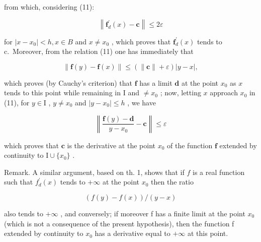 from which, considering (11):

\[
\left\| \mathbf {f} _ {d} ^ {\prime} (x) - \mathbf {c} \right\| \leqslant 2 \varepsilon
\]

for \(|x - x_{0}| < h, x \in B\) and \(x \neq x_{0}\) , which proves that \(\mathbf{f}_{d}^{\prime}(x)\) tends to c.~Moreover, from the relation (11) one has immediately that

\[
\left\| \mathbf {f} (y) - \mathbf {f} (x) \right\| \leqslant \left(\left\| \mathbf {c} \right\| + \varepsilon\right) | y - x |,
\]

which proves (by Cauchy's criterion) that \(\mathbf{f}\) has a limit \(\mathbf{d}\) at the point \(x_0\) as \(x\) tends to this point while remaining in \(\mathrm{I}\) and \(\neq x_0\) ; now, letting \(x\) approach \(x_0\) in (11), for \(y \in \mathrm{I}\) , \(y \neq x_0\) and \(|y - x_0| \leqslant h\) , we have

\[
\left\| \frac {\mathbf {f} (y) - \mathbf {d}}{y - x _ {0}} - \mathbf {c} \right\| \leqslant \varepsilon
\]

which proves that \(\mathbf{c}\) is the derivative at the point \(x_0\) of the function \(\mathbf{f}\) extended by continuity to \(\mathrm{I} \cup \{x_0\}\) .

Remark. A similar argument, based on th. 1, shows that if \(f\) is a real function such that \(f_{d}^{\prime}(x)\) tends to \(+\infty\) at the point \(x_0\) then the ratio

\[
(f (y) - f (x)) / (y - x)
\]

also tends to \(+\infty\) , and conversely; if moreover f has a finite limit at the point \(x_{0}\) (which is not a consequence of the present hypothesis), then the function f extended by continuity to \(x_{0}\) has a derivative equal to \(+\infty\) at this point.

